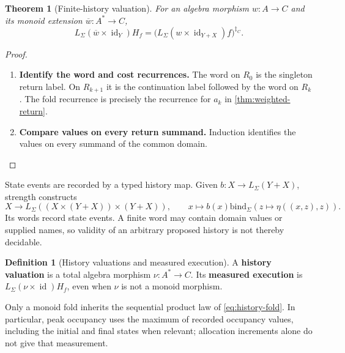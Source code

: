 \documentclass[11pt,a4paper]{article}
\numberwithin{algorithm}{section}
\numberwithin{equation}{section}
\newtheorem{theorem}{Theorem}[section]
\theoremstyle{definition}
\newtheorem{definition}[definition]{Definition}
\theoremstyle{remark}
\theoremstyle{plain}
\newcommand{\LL}{L_{\Sigma}}
\newcommand{\id}{\operatorname{id}}
\newcommand{\bind}{\mathbin{\mathrm{bind}}}
\theoremstyle{definition}
\theoremstyle{plain}
\begin{document}
\begin{theorem}[Finite-history valuation]\label{thm:history-valuation}
For an algebra morphism $w:A\to C$ and its monoid extension
$\overline w:A^*\to C$,
\begin{equation}\label{eq:history-fold}
 \LL(\overline w\times\id_Y)H_f
 =\bigl(\LL(w\times\id_{Y+X})f\bigr)^{\ddagger_C}.
\end{equation}
\end{theorem}
\begin{proof}\leavevmode
\begin{enumerate}[leftmargin=*,align=left]
\item \textbf{Identify the word and cost recurrences.}
The word on $R_0$ is the singleton return label. On $R_{k+1}$ it is the
continuation label followed by the word on $R_k$. The fold recurrence
is precisely the recurrence for $a_k$ in \cref{thm:weighted-return}.

\item \textbf{Compare values on every return summand.}
Induction identifies the values on every summand of the common domain.
\end{enumerate}
\end{proof}


State events are recorded by a typed history map. Given $b:X\to\LL(Y+X)$, strength constructs
\[
 X\to\LL((X\times(Y+X))\times(Y+X)),\qquad
 x\mapsto b(x)\bind_\Sigma(z\mapsto\eta((x,z),z)).
\]
Its words record state events. A finite word may contain domain
values or supplied names, so validity of an arbitrary proposed history
is not thereby decidable. 

\begin{definition}[History valuations and measured execution]\label{def:history-valuations}
A \textbf{history valuation} is a total algebra morphism
$\nu:A^*\to C$. Its \textbf{measured execution} is
$\LL(\nu\times\id)H_f$, even when $\nu$ is not a
monoid morphism.
\end{definition}

 Only a monoid fold inherits the sequential product law
of \eqref{eq:history-fold}. In particular, peak occupancy uses the maximum
of recorded occupancy values, including the initial and final states
when relevant; allocation increments alone do not give that measurement.
\end{document}
